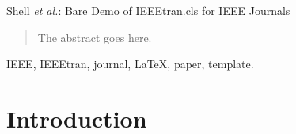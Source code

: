 \documentclass[journal]{IEEEtran}
\begin{document}
%
{Shell \MakeLowercase{\textit{et al.}}: Bare Demo of IEEEtran.cls for IEEE Journals}
% 











\maketitle

\begin{abstract}
The abstract goes here.
\end{abstract}

\begin{IEEEkeywords}
IEEE, IEEEtran, journal, \LaTeX, paper, template.
\end{IEEEkeywords}

%
\IEEEpeerreviewmaketitle



\section{Introduction}
\end{document}
